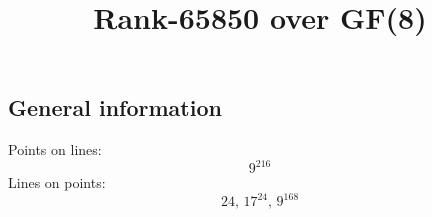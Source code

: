 \documentclass{article}
\newcommand\setTBstruts{\def\T{\rule{0pt}{2.6ex}}%
\def\B{\rule[-1.2ex]{0pt}{0pt}}}
\begin{document}
 
\setTBstruts



{\allowdisplaybreaks%






\title{Rank-65850 over GF(8)}
\author{}%
\maketitle%
%
{}



\subsection*{General information}
Points on lines:
$$
9^{216}$$
Lines on points:
$$
24,\,17^{24},\,9^{168}$$
}
\end{document}
